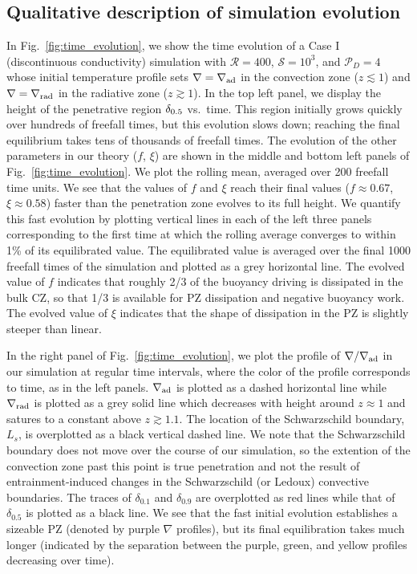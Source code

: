 \documentclass[twocolumn]{aastex631}
\newcommand{\gradrad}{\ensuremath{\nabla_{\rm{rad}}}}
\newcommand{\gradad}{\ensuremath{\nabla_{\rm{ad}}}}
\newcommand{\justgrad}{\ensuremath{\nabla}}
\newcommand{\mP}{\ensuremath{\mathcal{P}}}
\newcommand{\mR}{\ensuremath{\mathcal{R}}}
\newcommand{\mS}{\ensuremath{\mathcal{S}}}
\begin{document}
\subsection{Qualitative description of simulation evolution}

In Fig.~\ref{fig:time_evolution}, we show the time evolution of a Case I (discontinuous conductivity) simulation with $\mR = 400$, $\mS = 10^3$, and $\mP_D = 4$ whose initial temperature profile sets $\justgrad = \gradad$ in the convection zone ($z \lesssim 1$) and $\justgrad = \gradrad$ in the radiative zone ($z \gtrsim 1$).
In the top left panel, we display the height of the penetrative region $\delta_{\rm{0.5}}$ vs.~time.
This region initially grows quickly over hundreds of freefall times, but this evolution slows down; reaching the final equilibrium takes tens of thousands of freefall times.
The evolution of the other parameters in our theory ($f$, $\xi$) are shown in the middle and bottom left panels of Fig.~\ref{fig:time_evolution}.
We plot the rolling mean, averaged over 200 freefall time units. 
We see that the values of $f$ and $\xi$ reach their final values ($f \approx 0.67$, $\xi \approx 0.58$) faster than the penetration zone evolves to its full height.
We quantify this fast evolution by plotting vertical lines in each of the left three panels corresponding to the first time at which the rolling average converges to within 1\% of its equilibrated value.
The equilibrated value is averaged over the final 1000 freefall times of the simulation and plotted as a grey horizontal line.
The evolved value of $f$ indicates that roughly 2/3 of the buoyancy driving is dissipated in the bulk CZ, so that 1/3 is available for PZ dissipation and negative buoyancy work.
The evolved value of $\xi$ indicates that the shape of dissipation in the PZ is slightly steeper than linear.

In the right panel of Fig.~\ref{fig:time_evolution}, we plot the profile of $\justgrad/\gradad$ in our simulation at regular time intervals, where the color of the profile corresponds to time, as in the left panels.
$\gradad$ is plotted as a dashed horizontal line while $\gradrad$ is plotted as a grey solid line which decreases with height around $z \approx 1$ and satures to a constant above $z \gtrsim 1.1$.
The location of the Schwarzschild boundary, $L_s$, is overplotted as a black vertical dashed line.
We note that the Schwarzschild boundary does not move over the course of our simulation, so the extention of the convection zone past this point is true penetration and not the result of entrainment-induced changes in the Schwarzschild (or Ledoux) convective boundaries.
The traces of $\delta_{0.1}$ and $\delta_{0.9}$ are overplotted as red lines while that of $\delta_{0.5}$ is plotted as a black line.
We see that the fast initial evolution establishes a sizeable PZ (denoted by purple $\justgrad$ profiles), but its final equilibration takes much longer (indicated by the separation between the purple, green, and yellow profiles decreasing over time).
\end{document}
